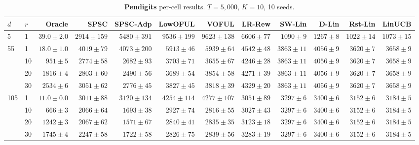 \begin{table}[!htbp]
\centering
\caption{\textbf{Pendigits} per-cell results. $T{=}5{,}000$, $K{=}10$, 10 seeds.}
\label{tab:app-pendigits}
\scriptsize
\setlength{\tabcolsep}{3pt}
\begin{tabular}{llrrrrrrrrrr}
\toprule
$d$ & $r$ & Oracle & \textbf{SPSC} & \textbf{SPSC-Adp} & LowOFUL & VOFUL & LR-Rew & SW-Lin & D-Lin & Rst-Lin & LinUCB \\
\midrule
5 & 1 & $39.0{\pm}2.0$ & $2914{\pm}159$ & $5480{\pm}391$ & $9536{\pm}199$ & $9623{\pm}138$ & $6606{\pm}77$ & $1090{\pm}9$ & $1267{\pm}8$ & \underline{$1022{\pm}14$} & $1073{\pm}15$ \\
55 & 1 & $18.0{\pm}1.0$ & $4019{\pm}79$ & $4073{\pm}200$ & $5913{\pm}46$ & $5939{\pm}64$ & $4542{\pm}48$ & $3863{\pm}11$ & $4056{\pm}9$ & \underline{$3620{\pm}7$} & $3658{\pm}9$ \\
 & 10 & $951{\pm}5$ & \cellcolor{green!12}$2774{\pm}58$ & \cellcolor{green!12}$2682{\pm}93$ & $3703{\pm}71$ & $3655{\pm}67$ & $4246{\pm}28$ & $3863{\pm}11$ & $4056{\pm}9$ & \underline{$3620{\pm}7$} & $3658{\pm}9$ \\
 & 20 & $1816{\pm}4$ & \cellcolor{green!12}$2803{\pm}60$ & \cellcolor{green!12}$2490{\pm}56$ & $3689{\pm}54$ & $3854{\pm}58$ & $4271{\pm}39$ & $3863{\pm}11$ & $4056{\pm}9$ & \underline{$3620{\pm}7$} & $3658{\pm}9$ \\
 & 30 & $2534{\pm}6$ & \cellcolor{green!12}$3051{\pm}62$ & \cellcolor{green!12}$2776{\pm}45$ & $3827{\pm}45$ & $3818{\pm}39$ & $4329{\pm}20$ & $3863{\pm}11$ & $4056{\pm}9$ & \underline{$3620{\pm}7$} & $3658{\pm}9$ \\
105 & 1 & $11.0{\pm}0.0$ & \cellcolor{green!12}$3011{\pm}88$ & $3120{\pm}134$ & $4254{\pm}114$ & $4277{\pm}107$ & \underline{$3051{\pm}89$} & $3297{\pm}6$ & $3400{\pm}6$ & $3152{\pm}6$ & $3184{\pm}5$ \\
 & 10 & $666{\pm}3$ & \cellcolor{green!12}$2066{\pm}64$ & \cellcolor{green!12}$1693{\pm}38$ & $2927{\pm}74$ & \underline{$2816{\pm}55$} & $3027{\pm}43$ & $3297{\pm}6$ & $3400{\pm}6$ & $3152{\pm}6$ & $3184{\pm}5$ \\
 & 20 & $1242{\pm}3$ & \cellcolor{green!12}$2067{\pm}62$ & \cellcolor{green!12}$1571{\pm}67$ & $2840{\pm}41$ & \underline{$2835{\pm}35$} & $3123{\pm}18$ & $3297{\pm}6$ & $3400{\pm}6$ & $3152{\pm}6$ & $3184{\pm}5$ \\
 & 30 & $1745{\pm}4$ & \cellcolor{green!12}$2247{\pm}58$ & \cellcolor{green!12}$1722{\pm}58$ & \underline{$2826{\pm}75$} & $2839{\pm}56$ & $3283{\pm}19$ & $3297{\pm}6$ & $3400{\pm}6$ & $3152{\pm}6$ & $3184{\pm}5$ \\
\bottomrule
\end{tabular}
\end{table}

